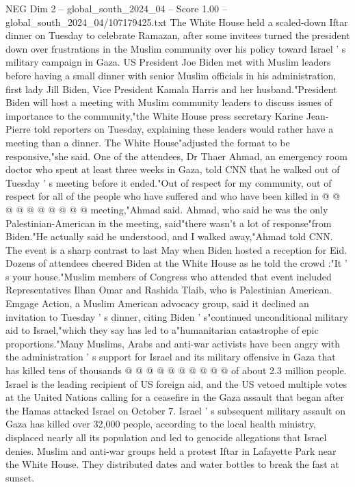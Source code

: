 \begin{textsample}{NEG Dim 2 – global\_south\_2024\_04 – Score 1.00 – global\_south\_2024\_04/107179425.txt}  \label{ex:f2_neg_397}
The White House held a scaled-down Iftar dinner on Tuesday to celebrate Ramazan, after some invitees turned the president down over frustrations in the Muslim community over his policy toward Israel ' s military campaign in Gaza.
US President Joe Biden met with Muslim leaders before having a small dinner with senior Muslim officials in his administration, first lady Jill Biden, Vice President Kamala Harris and her husband."President Biden will host a meeting with Muslim community leaders to discuss issues of importance to the community,"the White House press secretary Karine Jean-Pierre told reporters on Tuesday, explaining these leaders would rather have a meeting than a dinner.
The White House"adjusted the format to be responsive,"she said.
One of the attendees, Dr Thaer Ahmad, an emergency room doctor who spent at least three weeks in Gaza, told CNN that he walked out of Tuesday ' s meeting before it ended."Out of respect for my community, out of respect for all of the people who have suffered and who have been killed in @ @ @ @ @ @ @ @ @ @ meeting,"Ahmad said.
Ahmad, who said he was the only Palestinian-American in the meeting, said"there wasn't a lot of response"from Biden."He actually said he understood, and I walked away,"Ahmad told CNN.
The event is a sharp contrast to last May when Biden hosted a reception for Eid.
Dozens of attendees cheered Biden at the White House as he told the crowd :"It ' s your house."Muslim members of Congress who attended that event included Representatives Ilhan Omar and Rashida Tlaib, who is Palestinian American.
Emgage Action, a Muslim American advocacy group, said it declined an invitation to Tuesday ' s dinner, citing Biden ' s"continued unconditional military aid to Israel,"which they say has led to a"humanitarian catastrophe of epic proportions."Many Muslims, Arabs and anti-war activists have been angry with the administration ' s support for Israel and its military offensive in Gaza that has killed tens of thousands @ @ @ @ @ @ @ @ @ @ of about 2.3 million people.
Israel is the leading recipient of US foreign aid, and the US vetoed multiple votes at the United Nations calling for a ceasefire in the Gaza assault that began after the Hamas attacked Israel on October 7.
Israel ' s subsequent military assault on Gaza has killed over 32,000 people, according to the local health ministry, displaced nearly all its population and led to genocide allegations that Israel denies.
Muslim and anti-war groups held a protest Iftar in Lafayette Park near the White House.
They distributed dates and water bottles to break the fast at sunset.

\end{textsample}
